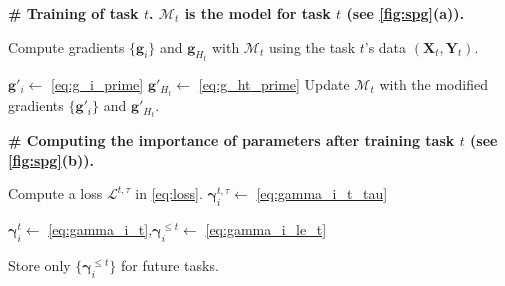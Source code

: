 \begin{algorithm}[tb]
\caption{
Continual Learning in SPG.
}
\label{alg:spg}
\begin{algorithmic}[1]

\STATE \textbf{\# Training of task $t$. $\mathcal{M}_t$ is the model for task $t$ (see \cref{fig:spg}(a)).}

\REPEAT
\STATE Compute gradients $\{ \bm{g}_i \}$ and $\bm{g}_{H_t}$ with $\mathcal{M}_t$ using the task $t$'s data $(\bm{X}_t, \bm{Y}_t)$.

\STATE $\bm{g}'_i \leftarrow$ \cref{eq:g_i_prime}
\ENDFOR
{}
\STATE $\bm{g}'_{H_t} \leftarrow$ \cref{eq:g_ht_prime}
\ENDFOR
\STATE Update $\mathcal{M}_t$ with the modified gradients $\{ \bm{g}'_i \}$ and $\bm{g}'_{H_t}$.



\STATE \textbf{\# Computing the importance of parameters after training task $t$ (see \cref{fig:spg}(b)).}

\STATE Compute a loss $\mathcal{L}^{t,\tau}$ in \cref{eq:loss}.
\STATE $\bm{\gamma}_i^{t,\tau} \leftarrow$ \cref{eq:gamma_i_t_tau}
\ENDFOR
\ENDFOR

\STATE $\bm{\gamma}_i^t \leftarrow$ \cref{eq:gamma_i_t},\enspace $\bm{\gamma}_i^{\le t} \leftarrow$ \cref{eq:gamma_i_le_t}
\ENDFOR

\STATE Store only $\{ \bm{\gamma}_i^{\le t} \}$ for future tasks.

\ENDFOR
\end{algorithmic}

\end{algorithm}


